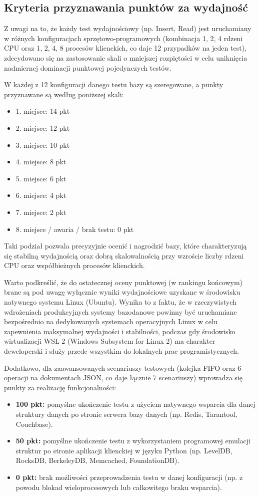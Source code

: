 \subsection{Kryteria przyznawania punktów za wydajność}

Z uwagi na to, że każdy test wydajnościowy (np. Insert, Read) jest uruchamiany w różnych konfiguracjach sprzętowo-programowych (kombinacja 1, 2, 4 rdzeni CPU oraz 1, 2, 4, 8 procesów klienckich, co daje 12 przypadków na jeden test), zdecydowano się na zastosowanie skali o mniejszej rozpiętości w celu uniknięcia nadmiernej dominacji punktowej pojedynczych testów.

W każdej z 12 konfiguracji danego testu bazy są szeregowane, a punkty przyznawane są według poniższej skali:
\begin{itemize}
    \item 1. miejsce: 14 pkt
    \item 2. miejsce: 12 pkt
    \item 3. miejsce: 10 pkt
    \item 4. miejsce: 8 pkt
    \item 5. miejsce: 6 pkt
    \item 6. miejsce: 4 pkt
    \item 7. miejsce: 2 pkt
    \item 8. miejsce / awaria / brak testu: 0 pkt
\end{itemize}

Taki podział pozwala precyzyjnie ocenić i nagrodzić bazy, które charakteryzują się stabilną wydajnością oraz dobrą skalowalnością przy wzroście liczby rdzeni CPU oraz współbieżnych procesów klienckich.

Warto podkreślić, że do ostatecznej oceny punktowej (w rankingu końcowym) brane są pod uwagę wyłącznie wyniki wydajnościowe uzyskane w środowisku natywnego systemu Linux (Ubuntu). Wynika to z faktu, że w rzeczywistych wdrożeniach produkcyjnych systemy bazodanowe powinny być uruchamiane bezpośrednio na dedykowanych systemach operacyjnych Linux w celu zapewnienia maksymalnej wydajności i stabilności, podczas gdy środowisko wirtualizacji WSL 2 (Windows Subsystem for Linux 2) ma charakter deweloperski i służy przede wszystkim do lokalnych prac programistycznych.

Dodatkowo, dla zaawansowanych scenariuszy testowych (kolejka FIFO oraz 6 operacji na dokumentach JSON, co daje łącznie 7 scenariuszy) wprowadza się punkty za realizację funkcjonalności:
\begin{itemize}
    \item \textbf{100 pkt:} pomyślne ukończenie testu z użyciem natywnego wsparcia dla danej struktury danych po stronie serwera bazy danych (np. Redis, Tarantool, Couchbase).
    \item \textbf{50 pkt:} pomyślne ukończenie testu z wykorzystaniem programowej emulacji struktur po stronie aplikacji klienckiej w języku Python (np. LevelDB, RocksDB, BerkeleyDB, Memcached, FoundationDB).
    \item \textbf{0 pkt:} brak możliwości przeprowadzenia testu w danej konfiguracji (np. z powodu blokad wieloprocesowych lub całkowitego braku wsparcia).
\end{itemize}

